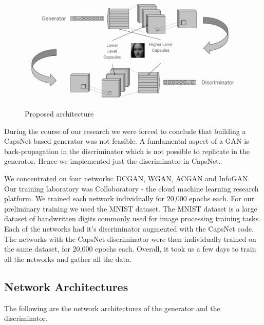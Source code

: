 \documentclass{vldb}
\begin{document}
\begin{figure}[H]
\centering\includegraphics[width=\linewidth]{../Final_Report/images/methodology.png}
\caption{Proposed architecture}
\label{fig:capsgan}
\end{figure}

During the course of our research we were forced to conclude that building a CapsNet based generator was not feasible. A fundamental aspect of a GAN is back-propagation in the discriminator which is not possible to replicate in the generator. Hence we implemented just the discriminator in CapsNet. 
\par\bigskip

We concentrated on four networks: DCGAN, WGAN, ACGAN and InfoGAN. Our training laboratory was Colloboratory - the cloud machine learning research platform. We trained each network individually for 20,000 epochs each. For our preliminary training we used the MNIST dataset. The MNIST dataset is a large dataset of handwritten digits commonly used for image processing training tasks. Each of the networks had it's discriminator augmented with the CapsNet code. The networks with the CapsNet discriminator were then individually trained on the same dataset, for 20,000 epochs each. Overall, it took us a few days to train all the networks and gather all the data.
\par\bigskip

\subsection{Network Architectures} %
\label{sec:network_architectures}
The following are the network architectures of the generator and the discriminator.
\end{document}
